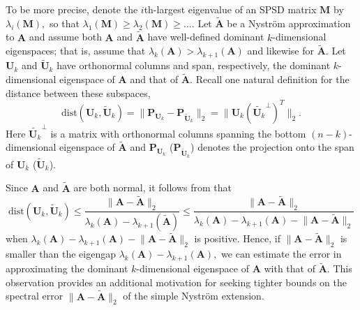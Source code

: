 \documentclass[11pt,letterpaper,twoside,reqno,nosumlimits]{amsart}
\def\transp{T}
\newcommand{\mat}[1]{\ensuremath{\mathbf{#1}}}
\newcommand{\snorm}[1]{\ensuremath{\big\|#1\big\|_2}}
\theoremstyle{remark}
\begin{document}
To be more precise, denote the $i$th-largest eigenvalue of an SPSD matrix $\mat{M}$ by $\lambda_i(\mat{M}),$ so that $\lambda_1(\mat{M}) \geq \lambda_2(\mat{M}) \geq \ldots.$ Let $\tilde{\mat{A}}$ be a Nystr\"om approximation to $\mat{A}$ and assume both $\mat{A}$ and $\tilde{\mat{A}}$ have well-defined dominant $k$-dimensional eigenspaces; that is, assume that $\lambda_{k}(\mat{A}) > \lambda_{k+1}(\mat{A})$ and likewise for $\tilde{\mat{A}}$. Let $\mat{U}_k$ and $\tilde{\mat{U}}_k$ have orthonormal columns and span, respectively, the dominant $k$-dimensional eigenspace of $\mat{A}$ and that of $\tilde{\mat{A}}.$ Recall one natural definition for the distance between these subspaces,  
\[
 \text{dist}(\mat{U}_k, \tilde{\mat{U}}_k) = \snorm{\mat{P}_{\mat{U}_k} - \mat{P}_{\tilde{\mat{U}}_k}} = \snorm{\mat{U}_k (\tilde{\mat{U}_k}^\perp)^\transp}.
\]
Here $\tilde{\mat{U}_k}^\perp$ is a matrix with orthonormal columns spanning the bottom $(n-k)$-dimensional eigenspace of $\tilde{\mat{A}}$ and $\mat{P}_{\mat{U}_k}$ ($\mat{P}_{\tilde{\mat{U}}_k}$) denotes the projection onto the span of $\mat{U}_k$ ($\tilde{\mat{U}}_k$).

Since $\mat{A}$ and $\tilde{\mat{A}}$ are both normal, it follows from \cite[Theorem VII.3.1]{Bhatia97} that 
\begin{equation}
 \text{dist}(\mat{U}_k, \tilde{\mat{U}}_k) \leq \frac{\snorm{\mat{A} - \tilde{\mat{A}}}}{\lambda_k(\mat{A}) - \lambda_{k+1}(\tilde{\mat{A}})} \leq \frac{\snorm{\mat{A} - \tilde{\mat{A}}}}{\lambda_k(\mat{A}) - \lambda_{k+1}(\mat{A}) - \snorm{\mat{A} - \tilde{\mat{A}}}}
\label{eqn:rawdksintheta}
\end{equation}
when $\lambda_k(\mat{A}) - \lambda_{k+1}(\mat{A}) - \snorm{\mat{A} - \tilde{\mat{A}}}$ is positive. Hence, if $\snorm{\mat{A} - \tilde{\mat{A}}}$ is smaller than the eigengap $\lambda_k(\mat{A}) - \lambda_{k+1}(\mat{A}),$ we can estimate the error in approximating the dominant $k$-dimensional eigenspace of $\mat{A}$ with that of $\tilde{\mat{A}}.$ This observation provides an additional motivation for seeking tighter bounds on the spectral error $\snorm{\mat{A} - \tilde{\mat{A}}}$ of the simple Nystr\"om extension.
\end{document}
